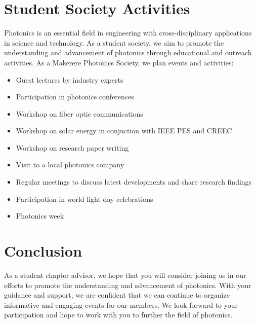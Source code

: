 \documentclass[a4paper]{article}
\begin{document}
    \section{Student Society Activities}
    Photonics is an essential field in engineering with cross-disciplinary applications in science and technology.
    As a student society, we aim to promote the understanding and advancement of photonics through educational and outreach activities.
    As a Makerere Photonics Society, we plan events and activities:
    \begin{itemize}
    \item Guest lectures by industry experts
    \item Participation in photonics conferences
    \item Workshop on fiber optic communications
    \item Workshop on solar energy in conjuction with IEEE PES and CREEC
    \item Workshop on research paper writing
    \item Visit to a local photonics company
    \item Regular meetings to discuss latest developments and share research findings
    \item Participation in world light day celebrations
    \item Photonics week
    \end{itemize}

    \section{Conclusion}
    As a student chapter advisor, we hope that you will consider joining us in our efforts to promote the understanding and advancement of photonics.
    With your guidance and support, we are confident that we can continue to organize informative and engaging events for our members.
    We look forward to your participation and hope to work with you to further the field of photonics.
\end{document}
